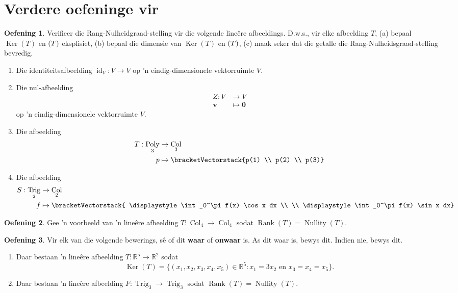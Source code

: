 \documentclass[a4paper,11pt]{book}
\theoremstyle{definition}
\newtheorem{exercise}{Oefening}
\newcommand{\ve}[1]{\mathbf{#1}}
\newcommand{\cvector}[1]{\bracketVectorstack{#1}}
\newcommand{\furtherexercises}{\section*{Verdere oefeninge vir
\thesection}}
\DeclareMathOperator{\Poly}{Poly}
\DeclareMathOperator{\Trig}{Trig}
\DeclareMathOperator{\Col}{Col}
\DeclareMathOperator{\id}{id}
\DeclareMathOperator{\Ker}{Ker}
\DeclareMathOperator{\Nullity}{Nullity}
\DeclareMathOperator{\Rank}{Rank}
\let\Im\relax
\DeclareMathOperator{\Im}{Im} %
\begin{document}
\furtherexercises
\begin{exercise} Verifieer die Rang-Nulheidgraad-stelling vir die volgende
	line{\^e}re afbeeldings. D.w.s., vir elke afbeelding $T$, (a) bepaal
	$\Ker(T)$ en $\Im(T)$ eksplisiet, (b) bepaal die dimensie van $\Ker(T)$
	en $\Im(T)$, (c) maak seker dat die getalle die
	Rang-Nulheidsgraad-stelling bevredig. 
	\begin{enumerate}
		\item Die identiteitsafbeelding $\id_V : V \rightarrow V$ op 'n
			eindig-dimensionele vektorruimte $V$.
		\item Die nul-afbeelding 
			\begin{align*}
				Z : V & \rightarrow V \\
				\ve{v} & \mapsto \ve{0}
			\end{align*}
			op 'n eindig-dimensionele vektorruimte $V$.
		\item Die afbeelding 
			\begin{align*} 
				T : \Poly_3 & \rightarrow \Col_3 \\
				p & \mapsto \cvector{p(1) \\ p(2) \\ p(3)}
			\end{align*}
		\item Die afbeelding
			\begin{align*}
				S : \Trig_2 & \rightarrow \Col_2 \\
				f & \mapsto \cvector{ \displaystyle \int_0^\pi f(x) \cos x
				dx \\ \\ \displaystyle \int_0^\pi f(x) \sin x dx} 
			\end{align*}
	\end{enumerate}
\end{exercise}

\begin{exercise} Gee 'n voorbeeld van 'n line{\^e}re afbeelding $T : \Col_4
	\rightarrow \Col_4$ sodat $\Rank(T) = \Nullity(T)$. 
\end{exercise}

\begin{exercise} Vir elk van die volgende bewerings, s{\^e} of dit
	{\bf waar} of {\bf onwaar} is. As dit waar is, bewys dit.  Indien nie,
	bewys dit.
	\begin{enumerate}
		\item Daar bestaan 'n line{\^e}re afbeelding $T : \mathbb{R}^5
			\rightarrow \mathbb{R}^2$ sodat 
			\[
				\Ker(T) = \{ (x_1, x_2, x_3, x_4, x_5) \in \mathbb{R}^5 :
				x_1 = 3x_2 \text{ en } x_3 = x_4 = x_5\}.
			\]
		\item Daar bestaan 'n line{\^e}re afbeelding $F : \Trig_3
			\rightarrow \Trig_3$ sodat $\Rank(T) = \Nullity(T)$. 
	\end{enumerate}
\end{exercise}
\end{document}
